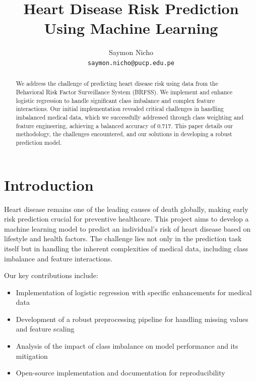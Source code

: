 \documentclass[10pt,conference,compsocconf]{IEEEtran}
\begin{document}
\title{Heart Disease Risk Prediction Using Machine Learning}

\author{
    Saymon Nicho\\
    \texttt{saymon.nicho@pucp.edu.pe}
}

\maketitle

\begin{abstract}
We address the challenge of predicting heart disease risk using data from the
Behavioral Risk Factor Surveillance System (BRFSS). We implement and enhance
logistic regression to handle significant class imbalance and complex feature interactions.
Our initial implementation revealed critical challenges in handling imbalanced medical data,
which we successfully addressed through class weighting and feature engineering,
achieving a balanced accuracy of 0.717. This paper details our methodology,
the challenges encountered, and our solutions in developing a robust prediction model.
\end{abstract}

\section{Introduction}

Heart disease remains one of the leading causes of death globally, making early risk
prediction crucial for preventive healthcare. This project aims to develop a
machine learning model to predict an individual's risk of heart disease based on
lifestyle and health factors. The challenge lies not only in the prediction task itself
but in handling the inherent complexities of medical data, including class imbalance and
feature interactions.

Our key contributions include:
\begin{itemize}
    \item Implementation of logistic regression with specific enhancements for medical data
    \item Development of a robust preprocessing pipeline for handling missing values and
    feature scaling
    \item Analysis of the impact of class imbalance on model performance and its mitigation
    \item Open-source implementation and documentation for reproducibility
\end{itemize}
\end{document}
